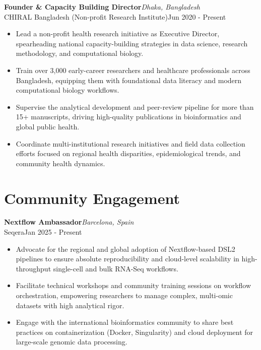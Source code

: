 \documentclass[
  11pt,
  letterpaper,
  DIV=11,
  numbers=noendperiod]{scrartcl}
\begin{document}
\noindent

\begin{minipage}{\linewidth}
\textbf{Founder \& Capacity Building Director}\hfill \textit{Dhaka, Bangladesh}\\
CHIRAL Bangladesh (Non-profit Research Institute)\hfill Jun 2020 - Present
\end{minipage}
\begin{itemize}[nosep,topsep=2pt,leftmargin=1em]
  \item Lead a non-profit health research initiative as Executive Director, spearheading national capacity-building strategies in data science, research methodology, and computational biology.
  \item Train over 3,000 early-career researchers and healthcare professionals across Bangladesh, equipping them with foundational data literacy and modern computational biology workflows.
  \item Supervise the analytical development and peer-review pipeline for more than 15+ manuscripts, driving high-quality publications in bioinformatics and global public health.
  \item Coordinate multi-institutional research initiatives and field data collection efforts focused on regional health disparities, epidemiological trends, and community health dynamics.
\end{itemize}
\vspace{5pt}

\section{Community Engagement}\label{community-engagement}

\noindent

\begin{minipage}{\linewidth}
\textbf{Nextflow Ambassador}\hfill \textit{Barcelona, Spain}\\
Seqera\hfill Jan 2025 - Present
\end{minipage}
\begin{itemize}[nosep,topsep=2pt,leftmargin=1em]
  \item Advocate for the regional and global adoption of Nextflow-based DSL2 pipelines to ensure absolute reproducibility and cloud-level scalability in high-throughput single-cell and bulk RNA-Seq workflows.
  \item Facilitate technical workshops and community training sessions on workflow orchestration, empowering researchers to manage complex, multi-omic datasets with high analytical rigor.
  \item Engage with the international bioinformatics community to share best practices on containerization (Docker, Singularity) and cloud deployment for large-scale genomic data processing.
\end{itemize}
\vspace{5pt}
\end{document}
